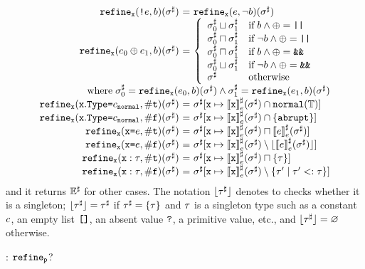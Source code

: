 \[
  \begin{array}{r@{~}c@{~}l}
    \refineVar(\code{!} \expr, \bool)(\aenv) &=&
    \refineVar(\expr, \neg \bool)(\aenv)\\

    \refineVar(\expr_0 \bop \expr_1, \bool)(\aenv) &=&
    \left\{
      \begin{array}{ll}
        \aenv_0 \join \aenv_1 & \text{if} \; \bool \wedge \bop = \code{||}\\
        \aenv_0 \meet \aenv_1 & \text{if} \; \neg\bool \wedge \bop = \code{||}\\
        \aenv_0 \meet \aenv_1 & \text{if} \; \bool \wedge \bop = \code{\&\&}\\
        \aenv_0 \join \aenv_1 & \text{if} \; \neg\bool \wedge \bop = \code{\&\&}\\
        \aenv & \text{otherwise}\\
      \end{array}
    \right.\\
    \multicolumn{3}{r}{
      \text{where} \;
      \aenv_0 = \refineVar(\expr_0, \bool)(\aenv) \wedge
      \aenv_1 = \refineVar(\expr_1, \bool)(\aenv)
    }\\

    \refineVar(\x.\Type \code{=} \nconst{normal}, \true)(\aenv) &=&
    \aenv[ \x \mapsto \aseme{\x}(\aenv) \cap \tnormal(\tyset) ]\\
    \refineVar(\x.\Type \code{=} \nconst{normal}, \false)(\aenv) &=&
    \aenv[ \x \mapsto \aseme{\x}(\aenv) \cap \{ \tabrupt \} ]\\

    \refineVar(\x \code{=} \expr, \true)(\aenv) &=&
    \aenv[ \x \mapsto \aseme{\x}(\aenv) \meet \aseme{\expr}(\aenv) ]\\
    \refineVar(\x \code{=} \expr, \false)(\aenv) &=&
    \aenv[ \x \mapsto \aseme{\x}(\aenv) \setminus
    \lfloor\aseme{\expr}(\aenv)\rfloor ]\\

    \refineVar(\x : \ty, \true)(\aenv) &=&
    \aenv[ \x \mapsto \aseme{\x}(\aenv) \meet \{ \ty \} ]\\
    \refineVar(\x : \ty, \false)(\aenv) &=&
    \aenv[ \x \mapsto \aseme{\x}(\aenv) \setminus \{ \ty' \mid \ty' \subtype \ty
    \}]\\
  \end{array}
\]
and it returns ${\mathbb{E}}^\sharp$ for other cases.  The notation $\lfloor \tau^\sharp \rfloor$ denotes
to checks whether it is a singleton; $\lfloor \tau^\sharp \rfloor = \tau^\sharp$ if $\tau^\sharp = \{ \tau
\}$ and $\tau$ is a singleton type such as a constant $c$, an empty list
$\texttt{[}  \texttt{]}$, an absent value $\texttt{?}$, a primitive value, etc., and
$\lfloor \tau^\sharp \rfloor = \varnothing$ otherwise.

\todo: $\texttt{refine}_{\texttt{p}}$?
